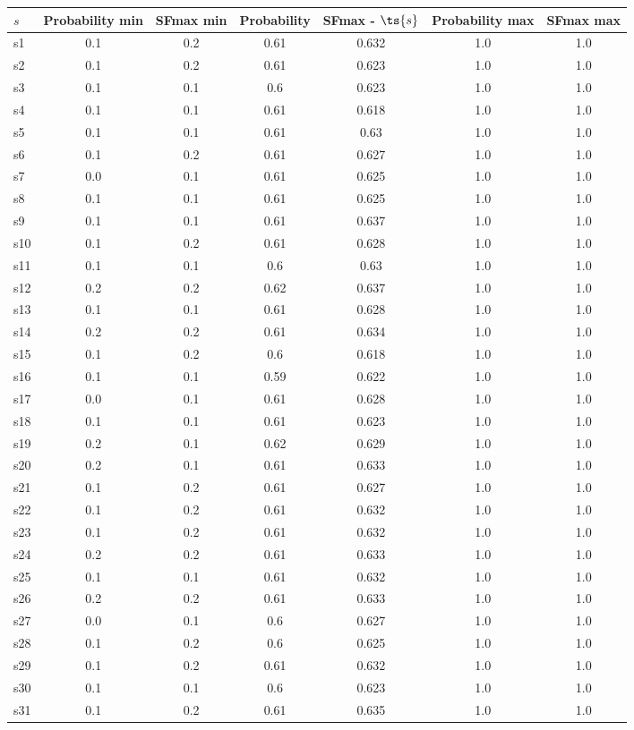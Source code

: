 \documentclass{article}
\begin{document}
\noindent\begin{tabular}{|l|c|c|c|c|c|c|}
\hline
$s$& Probability min & SFmax min & Probability & SFmax - $\ts{s}$ & Probability max & SFmax max\\
\hline
s1 &0.1 & 0.2 & 0.61 & 0.632 & 1.0 & 1.0\\
\hline
s2 &0.1 & 0.2 & 0.61 & 0.623 & 1.0 & 1.0\\
\hline
s3 &0.1 & 0.1 & 0.6 & 0.623 & 1.0 & 1.0\\
\hline
s4 &0.1 & 0.1 & 0.61 & 0.618 & 1.0 & 1.0\\
\hline
s5 &0.1 & 0.1 & 0.61 & 0.63 & 1.0 & 1.0\\
\hline
s6 &0.1 & 0.2 & 0.61 & 0.627 & 1.0 & 1.0\\
\hline
s7 &0.0 & 0.1 & 0.61 & 0.625 & 1.0 & 1.0\\
\hline
s8 &0.1 & 0.1 & 0.61 & 0.625 & 1.0 & 1.0\\
\hline
s9 &0.1 & 0.1 & 0.61 & 0.637 & 1.0 & 1.0\\
\hline
s10 &0.1 & 0.2 & 0.61 & 0.628 & 1.0 & 1.0\\
\hline
s11 &0.1 & 0.1 & 0.6 & 0.63 & 1.0 & 1.0\\
\hline
s12 &0.2 & 0.2 & 0.62 & 0.637 & 1.0 & 1.0\\
\hline
s13 &0.1 & 0.1 & 0.61 & 0.628 & 1.0 & 1.0\\
\hline
s14 &0.2 & 0.2 & 0.61 & 0.634 & 1.0 & 1.0\\
\hline
s15 &0.1 & 0.2 & 0.6 & 0.618 & 1.0 & 1.0\\
\hline
s16 &0.1 & 0.1 & 0.59 & 0.622 & 1.0 & 1.0\\
\hline
s17 &0.0 & 0.1 & 0.61 & 0.628 & 1.0 & 1.0\\
\hline
s18 &0.1 & 0.1 & 0.61 & 0.623 & 1.0 & 1.0\\
\hline
s19 &0.2 & 0.1 & 0.62 & 0.629 & 1.0 & 1.0\\
\hline
s20 &0.2 & 0.1 & 0.61 & 0.633 & 1.0 & 1.0\\
\hline
s21 &0.1 & 0.2 & 0.61 & 0.627 & 1.0 & 1.0\\
\hline
s22 &0.1 & 0.2 & 0.61 & 0.632 & 1.0 & 1.0\\
\hline
s23 &0.1 & 0.2 & 0.61 & 0.632 & 1.0 & 1.0\\
\hline
s24 &0.2 & 0.2 & 0.61 & 0.633 & 1.0 & 1.0\\
\hline
s25 &0.1 & 0.1 & 0.61 & 0.632 & 1.0 & 1.0\\
\hline
s26 &0.2 & 0.2 & 0.61 & 0.633 & 1.0 & 1.0\\
\hline
s27 &0.0 & 0.1 & 0.6 & 0.627 & 1.0 & 1.0\\
\hline
s28 &0.1 & 0.2 & 0.6 & 0.625 & 1.0 & 1.0\\
\hline
s29 &0.1 & 0.2 & 0.61 & 0.632 & 1.0 & 1.0\\
\hline
s30 &0.1 & 0.1 & 0.6 & 0.623 & 1.0 & 1.0\\
\hline
s31 &0.1 & 0.2 & 0.61 & 0.635 & 1.0 & 1.0\\
\hline
\end{tabular}\\
\end{document}
